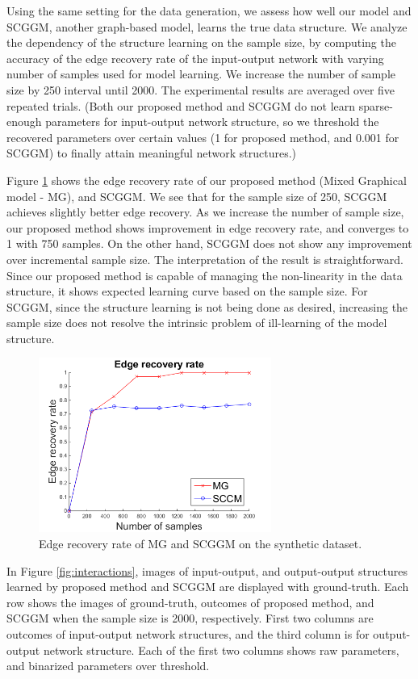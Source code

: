 \documentclass{article}
\begin{document}
Using the same setting for the data generation, we assess how well our model and SCGGM, another graph-based model, learns the true data structure.
We analyze the dependency of the structure learning on the sample size, by computing the accuracy of the edge recovery rate of the input-output network with varying number of samples used for model learning.
We increase the number of sample size by 250 interval until 2000.
The experimental results are averaged over five repeated trials.
(Both our proposed method and SCGGM do not learn sparse-enough parameters for input-output network structure, so we threshold the recovered parameters over certain values (1 for proposed method, and 0.001 for SCGGM) to finally attain meaningful network structures.)

Figure \ref{fig:syn_edge_rec} shows the edge recovery rate of our proposed method (Mixed Graphical model - MG), and SCGGM.
We see that for the sample size of 250, SCGGM achieves slightly better edge recovery. 
As we increase the number of sample size, our proposed method shows improvement in edge recovery rate, and converges to 1 with 750 samples. 
On the other hand, SCGGM does not show any improvement over incremental sample size.
The interpretation of the result is straightforward.
Since our proposed method is capable of managing the non-linearity in the data structure, it shows expected learning curve based on the sample size.
For SCGGM, since the structure learning is not being done as desired, increasing the sample size does not resolve the intrinsic problem of ill-learning of the model structure.

\begin{figure}[h]
  \centering
  \includegraphics[width=3in]{figure/EdgeRecRate2.png}
  \caption[] {Edge recovery rate of MG and SCGGM on the synthetic dataset.\label{fig:syn_edge_rec}}
\end{figure}


In Figure \ref{fig:interactions}, images of input-output, and output-output structures learned by proposed method and SCGGM are displayed with ground-truth.
Each row shows the images of ground-truth, outcomes of proposed method, and SCGGM when the sample size is 2000, respectively.
First two columns are outcomes of input-output network structures, and the third column is for output-output network structure. 
Each of the first two columns shows raw parameters, and binarized parameters over threshold.
\end{document}
